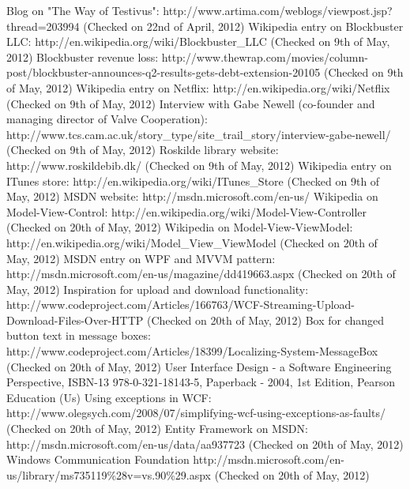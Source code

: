 \begin{thebibliography}{9}
\label{Biblio}
 Blog on "The Way of Testivus": http://www.artima.com/weblogs/viewpost.jsp?thread=203994 (Checked on 22nd of April, 2012)
 Wikipedia entry on Blockbuster LLC: http://en.wikipedia.org/wiki/Blockbuster\_LLC (Checked on 9th of May, 2012)
 Blockbuster revenue loss:  http://www.thewrap.com/movies/column-post/blockbuster-announces-q2-results-gets-debt-extension-20105 (Checked on 9th of May, 2012)
 Wikipedia entry on Netflix: http://en.wikipedia.org/wiki/Netflix (Checked on 9th of May, 2012)
 Interview with Gabe Newell (co-founder and managing director of Valve Cooperation): http://www.tcs.cam.ac.uk/story\_type/site\_trail\_story/interview-gabe-newell/ (Checked on 9th of May, 2012)
 Roskilde library website: http://www.roskildebib.dk/ (Checked on 9th of May, 2012)
 Wikipedia entry on ITunes store: http://en.wikipedia.org/wiki/ITunes\_Store (Checked on 9th of May, 2012)
 MSDN website: http://msdn.microsoft.com/en-us/ 
 Wikipedia on Model-View-Control: http://en.wikipedia.org/wiki/Model-View-Controller (Checked on 20th of May, 2012)
 Wikipedia on Model-View-ViewModel: http://en.wikipedia.org/wiki/Model\_View\_ViewModel (Checked on 20th of May, 2012)
 MSDN entry on WPF and MVVM pattern: http://msdn.microsoft.com/en-us/magazine/dd419663.aspx (Checked on 20th of May, 2012)
 Inspiration for upload and download functionality:  http://www.codeproject.com/Articles/166763/WCF-Streaming-Upload-Download-Files-Over-HTTP (Checked on 20th of May, 2012)
 Box for changed button text in message boxes: http://www.codeproject.com/Articles/18399/Localizing-System-MessageBox (Checked on 20th of May, 2012)
 User Interface Design - a Software Engineering Perspective, ISBN-13 978-0-321-18143-5, Paperback - 2004, 1st Edition, Pearson Education (Us)
 Using exceptions in WCF: http://www.olegsych.com/2008/07/simplifying-wcf-using-exceptions-as-faults/ (Checked on 20th of May, 2012)
 Entity Framework on MSDN: http://msdn.microsoft.com/en-us/data/aa937723 (Checked on 20th of May, 2012)
 Windows Communication Foundation http://msdn.microsoft.com/en-us/library/ms735119\%28v=vs.90\%29.aspx (Checked on 20th of May, 2012)
\end{thebibliography}
